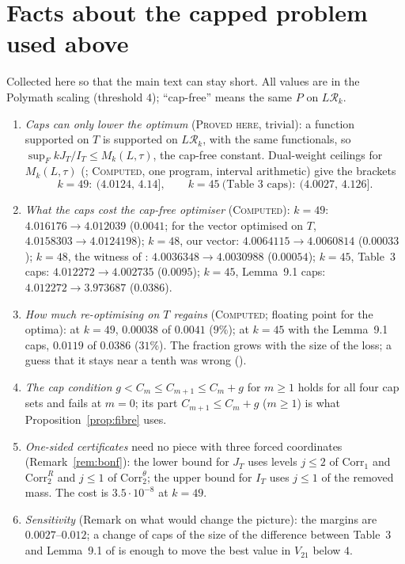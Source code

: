 \documentclass[11pt]{amsart}
\theoremstyle{definition}
\theoremstyle{remark}
\newcommand{\lbl}[1]{\textup{\textsc{#1}}}
\newcommand{\R}{\mathcal{R}}
\begin{document}
\appendix
\section{Facts about the capped problem used above}\label{app:facts}
Collected here so that the main text can stay short. All values are in the
Polymath scaling (threshold $4$); ``cap-free'' means the same $P$ on $L\R_k$.
\begin{enumerate}
\item \emph{Caps can only lower the optimum} (\lbl{Proved here}, trivial):
  a function supported on $T$ is supported on $L\R_k$, with the same
  functionals, so $\sup_F kJ_T/I_T\le M_k(L,\tau)$, the cap-free constant.
  Dual-weight ceilings for $M_k(L,\tau)$ (\cite[\S4]{Kim26}; \lbl{Computed},
  one program, interval arithmetic) give the brackets
  \[
  k=49:\ (4.0124,\,4.14],\qquad k=45\ \text{(Table~3 caps)}:\ (4.0027,\,4.126].
  \]
\item \emph{What the caps cost the cap-free optimiser} (\lbl{Computed}):
  $k=49$: $4.016176\to4.012039$ ($0.0041$; for the
  vector optimised on $T$, $4.0158303\to4.0124198$); $k=48$, our vector:
  $4.0064115\to4.0060814$ ($0.00033$); $k=48$, the witness of \cite{SY26}:
  $4.0036348\to4.0030988$ ($0.00054$); $k=45$, Table~3 caps:
  $4.012272\to4.002735$ ($0.0095$); $k=45$, Lemma~9.1 caps:
  $4.012272\to3.973687$ ($0.0386$).
\item \emph{How much re-optimising on $T$ regains} (\lbl{Computed};
  floating point for the optima): at $k=49$, $0.00038$ of $0.0041$ ($9\%$); at
  $k=45$ with the Lemma~9.1 caps, $0.0119$ of $0.0386$ ($31\%$). The fraction
  grows with the size of the loss; a guess that it stays near a tenth was wrong
  (\cite[\S5]{Kim26}).
\item \emph{The cap condition} $g<C_m\le C_{m+1}\le C_m+g$ for $m\ge1$ holds
  for all four cap sets and fails at $m=0$; its part $C_{m+1}\le C_m+g$
  ($m\ge1$) is what Proposition~\ref{prop:fibre} uses.
\item \emph{One-sided certificates} need no piece with three forced
  coordinates (Remark~\ref{rem:bonf}): the lower bound for $J_T$ uses levels
  $j\le2$ of $\mathrm{Corr}_1$ and $\mathrm{Corr}_2^R$ and $j\le1$ of
  $\mathrm{Corr}_2^\theta$; the upper bound for $I_T$ uses $j\le1$ of the
  removed mass. The cost is $3.5\cdot10^{-8}$ at $k=49$.
\item \emph{Sensitivity} (Remark on what would change the picture): the margins
  are $0.0027$--$0.012$; a change of caps of the size of the difference between
  Table~3 and Lemma~9.1 of \cite{Cha26} is enough to move the best value in
  $V_{21}$ below $4$.
\end{enumerate}
\end{document}
